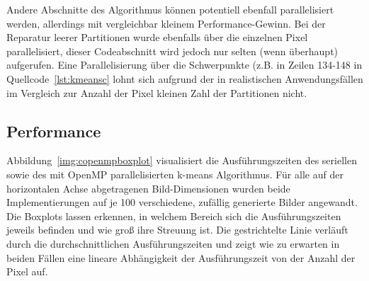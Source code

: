 \documentclass[
    bibliography=totoc, cd=lightcolor, cdmath=false, ngerman]{tudscrreprt}
\begin{document}
Andere Abschnitte des Algorithmus können potentiell ebenfall parallelisiert
werden, allerdings mit vergleichbar kleinem Performance-Gewinn. Bei der
Reparatur leerer Partitionen wurde ebenfalls über die einzelnen Pixel
parallelisiert, dieser Codeabschnitt wird jedoch nur selten (wenn überhaupt)
aufgerufen. Eine Parallelisierung über die Schwerpunkte (z.B. in Zeilen 134-148
in Quellcode~\ref{lst:kmeansc} lohnt sich aufgrund der in realistischen
Anwendungsfällen im Vergleich zur Anzahl der Pixel kleinen Zahl der Partitionen
nicht.



\subsection{Performance}

Abbildung~\ref{img:copenmpboxplot} visualisiert die Ausführungszeiten des
seriellen sowie des mit OpenMP parallelisierten k-means Algorithmus. Für alle
auf der horizontalen Achse abgetragenen Bild-Dimensionen wurden beide
Implementierungen auf je 100 verschiedene, zufällig generierte Bilder
angewandt. Die Boxplots lassen erkennen, in welchem Bereich sich die
Ausführungszeiten jeweils befinden und wie groß ihre Streuung ist. Die
gestrichtelte Linie verläuft durch die durchschnittlichen Ausführungszeiten und
zeigt wie zu erwarten in beiden Fällen eine lineare Abhängigkeit der
Ausführungszeit von der Anzahl der Pixel auf.
\end{document}
